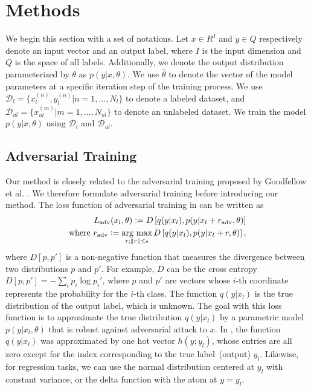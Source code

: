 \documentclass[10pt,journal,compsoc]{IEEEtran}
\newcommand{\argmax}{\mathop{\rm arg~max}\limits}
\newcommand{\defeq}{\vcentcolon=}
\newcommand\mnote[1]{\textcolor{blue}{(MIYATO: #1)}}
\newcommand\knote[1]{\textcolor{blue}{(Koyama: #1)}}
\newcommand\kwrite[1]{\textcolor{blue}{Koyama: #1}}
\newcommand\iwrite[1]{\textcolor{red}{Meada: #1}}
\begin{document}
\section{Methods}
We begin this section with a set of notations. 
Let $x \in R^I$ and $y \in Q$ respectively denote an input vector and an output label, where $I$ is the input dimension and $Q$ is the space of all labels. 
Additionally, we denote the output distribution parameterized by $\theta$ as $p(y|x, \theta)$. 
We use $\hat{\theta}$ to denote the vector of the model parameters at a specific iteration step of the training process. %
We use $\mathcal{D}_{l} = \{x_l^{(n)}, y_l^{(n)} | n = 1,\dots,N_l\}$ to denote a labeled dataset, and $\mathcal{D}_{ul} = \{x_{ul}^{(m)} | m = 1,\dots,N_{ul}\}$ to denote an unlabeled dataset. We train the model $p(y|x, \theta)$ using $\mathcal{D}_{l}$ and $\mathcal{D}_{ul}$.

\subsection{Adversarial Training}
Our method is closely related to the adversarial training proposed by Goodfellow et al. \cite{goodfellow2014explaining}.  We therefore formulate  adversarial training before introducing our method. 
The loss function of adversarial training in \cite{goodfellow2014explaining} can be written as
\begin{eqnarray}
L_{\rm adv}(x_l,\theta) \defeq D\left[q(y|x_l), p(y|x_l+r_{\rm adv},\theta)\right] \label{eq:adv_loss}\\
{\rm where}\ r_{\rm adv} \defeq \argmax_{r;\|r\|\leq\epsilon} D\left[q(y|x_l), p(y|x_l + r, \theta)\right], \label{eq:adv_ptb}
\end{eqnarray}
where $D[p, p']$ is a non-negative function that measures the divergence  between two distributions $p$ and $p'$. For example, $D$ can be the cross entropy $D[p,p']=-\sum_i p_i \log p_i'$, where $p$ and $p'$ are vectors whose $i$-th coordinate represents the probability for the $i$-th class. %
The function $q(y|x_l)$ is the true distribution of the output label, which is unknown.
The goal with this loss function is to approximate the true distribution $q(y|x_l)$ by a parametric model $p(y|x_l, \theta)$ that is robust against adversarial attack to $x$.
In \cite{goodfellow2014explaining}, the function $q(y|x_l)$ was approximated by one hot vector $h(y;y_l)$, whose entries are all zero except for the index corresponding to the true label~(output) $y_l$. 
Likewise, for regression tasks, we can use the normal distribution centered at $y_l$ with constant variance, or the delta function with the atom at $y = y_l$.%
\end{document}
